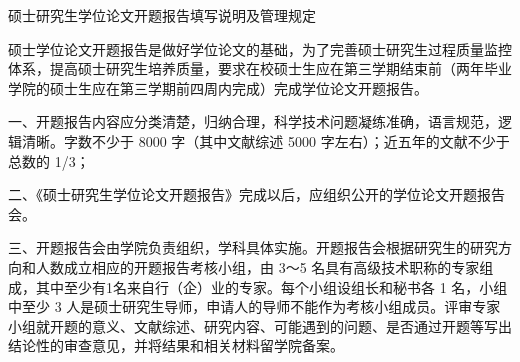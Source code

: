 \documentclass[a4paper,zihao=-4]{ctexart}
\newlength{\ktfieldblockw}
\newcommand{\ktfield}[3][4em]{\textbf{\zihao{3}\makebox[#1][s]{#2}：\underline{\makebox[\maxof{8.5cm}{\widthof{#3}}][c]{#3}}}\par\vspace{0.6em}}
\newcommand{\姓名}{}
\newcommand{\学号}{}
\newcommand{\学院}{}
\newcommand{\类别领域}{}
\newcommand{\指导教师}{}
\newcommand{\行业导师}{}
\newcommand{\论文题目}{}
\newcommand{\开题时间}{}
\begin{document}

\begin{center}
  {\heiti 硕士研究生学位论文开题报告填写说明及管理规定}%
\end{center}
\medskip

\par 硕士学位论文开题报告是做好学位论文的基础，为了完善硕士研究生过程质量监控体系，提高硕士研究生培养质量，要求在校硕士生应在第三学期结束前（两年毕业学院的硕士生应在第三学期前四周内完成）完成学位论文开题报告。

\par 一、开题报告内容应分类清楚，归纳合理，科学技术问题凝练准确，语言规范，逻辑清晰。字数不少于 8000 字（其中文献综述 5000 字左右）；近五年的文献不少于总数的 1/3；

\par 二、《硕士研究生学位论文开题报告》完成以后，应组织公开的学位论文开题报告会。

\par 三、开题报告会由学院负责组织，学科具体实施。开题报告会根据研究生的研究方向和人数成立相应的开题报告考核小组，由 3～5 名具有高级技术职称的专家组成，其中至少有1名来自行（企）业的专家。每个小组设组长和秘书各 1 名，小组中至少 3 人是硕士研究生导师，申请人的导师不能作为考核小组成员。评审专家小组就开题的意义、文献综述、研究内容、可能遇到的问题、是否通过开题等写出结论性的审查意见，并将结果和相关材料留学院备案。
\end{document}

